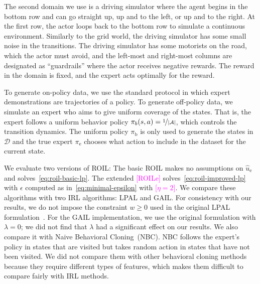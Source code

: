 \documentclass[10pt]{article}
\renewcommand{\cite}{\citep}
\theoremstyle{plain}
\theoremstyle{remark}
\newcommand{\mm}[1]{\textcolor{magenta}{[#1]}}
\begin{document}
The second domain we use is a driving simulator where the agent begins in the bottom row and can go straight up, up and to the left, or up and to the right. At the first row, the actor loops back to the bottom row to simulate a continuous environment. Similarly to the grid world, the driving simulator has some small noise in the transitions. The driving simulator has some motorists on the road, which the actor must avoid, and the left-most and right-most columns are designated as ``guardrails'' where the actor receives negative rewards. The reward in the domain is fixed, and the expert acts optimally for the reward. 

To generate on-policy data, we use the standard protocol in which expert demonstrations are trajectories of a policy. To generate off-policy data, we simulate an expert who aims to give uniform coverage of the states. That is, the expert follows a uniform behavior policy  $\pi_b(s,a) = \nicefrac{1}{\lvert \mathcal{A} \rvert}$, which controls the transition dynamics. The uniform policy $\pi_{\mathrm{b}}$ is only used to generate the states in $\mathcal{D}$ and the true expert $\pi_{\mathrm{e}}$ chooses what action to include in the dataset for the current state.


We evaluate two versions of ROIL: The basic ROIL makes no assumptions on $\hat{u}_{\mathrm{e}}$ and solves~\eqref{eq:roil-basic-lp}. The extended \mm{ROILe} solves~\eqref{eq:roil-improved-lp} with $\epsilon$ computed as in~\eqref{eq:minimal-epsilon} with \mm{$\eta = 2$}. We compare these algorithms with two IRL algorithms: LPAL and GAIL. For consistency with our results, we do not impose the constraint $w \ge 0$ used in the original LPAL formulation~\cite{Syed2008}. For the GAIL implementation, we use the original formulation with $\lambda = 0$; we did not find that $\lambda$ had a significant effect on our results. We also compare it with Naive Behavioral Cloning~(NBC). NBC follows the expert's policy in states that are visited but takes random action in states that have not been visited. We did not compare them with other behavioral cloning methods because they require different types of features, which makes them difficult to compare fairly with IRL methods. 
\end{document}
